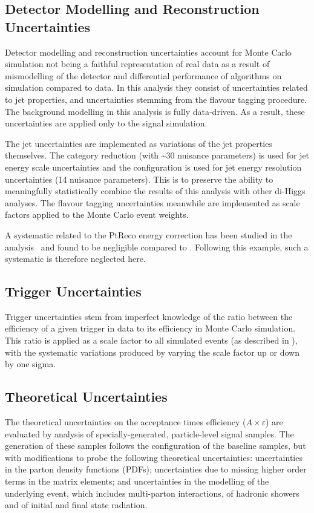 \FloatBarrier
\subsection{Detector Modelling and Reconstruction Uncertainties}%
\label{subsec:modelling-uncerts}
Detector modelling and reconstruction uncertainties account for Monte Carlo
simulation not being a faithful representation of real data as a result of
mismodelling of the detector and differential performance of algorithms on
simulation compared to data. In this analysis they consist of uncertainties
related to jet properties, and uncertainties stemming from the flavour tagging
procedure. The background modelling in this analysis is fully data-driven. As a
result, these uncertainties are applied only to the signal simulation.

The jet uncertainties are implemented as variations of the jet properties
themselves. The category reduction (with \textasciitilde 30 nuisance parameters)
is used for jet energy scale uncertainties and the  configuration
is used for jet energy resolution uncertainties (14 nuisance parameters). This
is to preserve the ability to meaningfully statistically combine the results of
this analysis with other di-Higgs analyses. The flavour tagging uncertainties
meanwhile are implemented as scale factors applied to the Monte Carlo event
weights.

A systematic related to the PtReco \bjet energy correction has been studied in the
\HepProcess{\higgs\higgs \to \gamma\gamma\Pqb\Paqb} analysis~\cite{bbyyNote} and found 
to be negligible compared to . Following this example, such a systematic is 
therefore neglected here.

\subsection{Trigger Uncertainties}
Trigger uncertainties stem from imperfect knowledge of the ratio between the
efficiency of a given trigger in data to its efficiency in Monte Carlo
simulation. This ratio is applied as a scale factor to all simulated events (as
described in \Sect{\ref{subsubsec:trig-sf}}), with the systematic variations
produced by varying the scale factor up or down by one sigma.


\subsection{Theoretical Uncertainties}
The theoretical uncertainties on the acceptance times efficiency ($A \times \varepsilon$) are
evaluated by analysis of specially-generated, particle-level signal samples. The
generation of these samples follows the configuration of the baseline samples,
but with modifications to probe the following theoretical uncertainties:
uncertainties in the parton density functions (PDFs); uncertainties due to
missing higher order terms in the matrix elements; and uncertainties in the
modelling of the underlying event, which includes multi-parton interactions, of
hadronic showers and of initial and final state radiation. 

